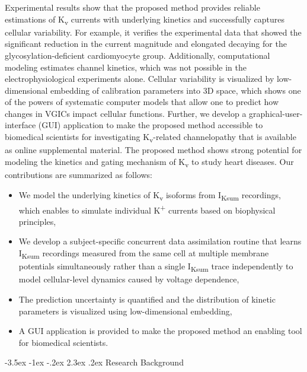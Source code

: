 \documentclass[11pt]{article}
\makeatletter
\renewcommand\section{\@startsection {section}{1}{\z@}%
                                   {-3.5ex \@plus -1ex \@minus -.2ex}%
                                   {2.3ex \@plus.2ex}%
                                   {\normalfont\fontfamily{phv}\fontsize{16}{19}\bfseries}}
\makeatother
\begin{document}
Experimental results show that the proposed method provides reliable estimations of K\textsubscript{v} currents with underlying kinetics and successfully captures cellular variability. For example, it verifies the experimental data that showed the significant reduction in the current magnitude and elongated decaying for the glycosylation-deficient cardiomyocyte group. Additionally, computational modeling estimates channel kinetics, which was not possible in the electrophysiological experiments alone. Cellular variability is visualized by low-dimensional embedding of calibration parameters into 3D space, which shows one of the powers of systematic computer models that allow one to predict how changes in VGICs impact cellular functions. Further, we develop a graphical-user-interface (GUI) application to make the proposed method accessible to biomedical scientists for investigating K\textsubscript{v}-related channelopathy that is available as online supplemental material. The proposed method shows strong potential for modeling the kinetics and gating mechanism of K\textsubscript{v} to study heart diseases. Our contributions are summarized as follows:
\begin{itemize}
    \item We model the underlying kinetics of K\textsubscript{v} isoforms from I\textsubscript{Ksum} recordings, which enables to simulate individual K\textsuperscript{+} currents based on biophysical principles,
    \item We develop a subject-specific concurrent data assimilation routine that learns I\textsubscript{Ksum} recordings measured from the same cell at multiple membrane potentials simultaneously rather than a single I\textsubscript{Ksum} trace independently to model cellular-level dynamics caused by voltage dependence, 
    \item The prediction uncertainty is quantified and the distribution of kinetic parameters is visualized using low-dimensional embedding,
    \item A GUI application is provided to make the proposed method an enabling tool for biomedical scientists.
\end{itemize}

\section{Research Background}
\end{document}
